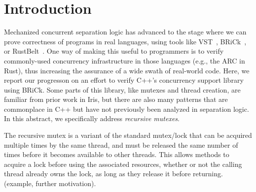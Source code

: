 \documentclass[sigplan,screen]{acmart}
\begin{document}


\maketitle

\section{Introduction}
Mechanized concurrent separation logic has advanced to the stage where we can prove correctness of programs in real languages, using tools like VST~\cite{vst}, BRiCk~\cite{brick}, or RustBelt~\cite{rustbelt}. One way of making this useful to programmers is to verify commonly-used concurrency infrastructure in those languages (e.g., the ARC in Rust), thus increasing the assurance of a wide swath of real-world code. Here, we report our progresson on an effort to verify C++'s concurrency support library~\cite{} using BRiCk. Some parts of this library, like mutexes and thread creation, are familiar from prior work in Iris, but there are also many patterns that are commonplace in C++ but have not previously been analyzed in separation logic. In this abstract, we specifically address \emph{recursive mutexes}.

The recursive mutex is a variant of the standard mutex/lock that can be acquired multiple times by the same thread, and must be released the same number of times before it becomes available to other threads. This allows methods to acquire a lock before using the associated resources, whether or not the calling thread already owns the lock, as long as they release it before returning. (example, further motivation).
\end{document}
